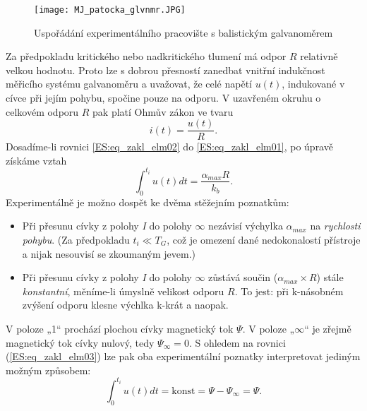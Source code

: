     \begin{figure}[ht!]
      \centering
      \texttt{[image: MJ\_patocka\_glvnmr.JPG]}
      \caption[Uspořádání experimentálního pracovište s balistickým galvanoměrem.]{Uspořádání
               experimentálního pracovište s balistickým galvanoměrem}
      \label{es:fig_MJ_patocka_glvnmr}
    \end{figure}   
    Za předpokladu kritického nebo nadkritického tlumení má odpor \(R\) relativně velkou hodnotu. Proto lze s 
    dobrou přesností zanedbat vnitřní indukčnost měřicího systému galvanoměru a uvažovat, že celé napětí 
    \(u(t)\), indukované v cívce při jejím pohybu, spočine pouze na odporu. V uzavřeném okruhu o celkovém 
    odporu \(R\) pak platí Ohmův zákon ve tvaru
    \begin{equation}\label{ES:eq_zakl_elm02}
      i(t)=\frac{u(t)}{R}.
    \end{equation}    
    Dosadíme-li rovnici \ref{ES:eq_zakl_elm02} do \ref{ES:eq_zakl_elm01}, po úpravě získáme vztah
    \begin{equation}\label{ES:eq_zakl_elm03}
     \int_0^{t_i}u(t)dt=\frac{\alpha_{max}R}{k_b}.
    \end{equation}     
    Experimentálně je možno dospět ke dvěma stěžejním poznatkům:
    \begin{itemize}
      \item Při přesunu cívky z polohy \emph{I} do polohy \(\infty\) nezávisí výchylka
            \(\alpha_{max}\) na \emph{rychlosti pohybu}. (Za předpokladu \(t_i\ll T_G\), což je
            omezení dané nedokonalostí přístroje a nijak nesouvisí se zkoumaným jevem.)
      \item Při přesunu cívky z polohy \emph{I} do polohy \(\infty\) zůstává součin
            (\(\alpha_{max}\times R\)) stále \emph{konstantní}, měníme-li úmyslně velikost odporu
            \(R\). To jest: při k-násobném zvýšení odporu klesne výchlka k-krát a naopak. 
    \end{itemize}

    V poloze „1“ prochází plochou cívky magnetický tok \(\Psi\). V poloze „\(\infty\)“ je zřejmě
    magnetický tok cívky nulový, tedy \(\Psi_\infty = 0\). S ohledem na rovnici
    (\ref{ES:eq_zakl_elm03}) lze pak oba experimentální poznatky interpretovat jediným možným
    způsobem:
     \begin{equation}\label{ES:eq_zakl_elm04}
     \int_0^{t_i}u(t)dt=\text{konst}=\Psi-\Psi_\infty=\Psi.
    \end{equation}    


